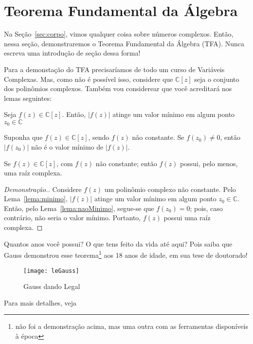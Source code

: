 
\section{Teorema Fundamental da Álgebra}
\label{sec:TFA}

Na Seção~\ref{sec:corpo}, vimos qualquer coisa sobre números complexos. 
Então, nessa seção, demonstraremos o \textsf{Teorema Fundamental da Álgebra} (TFA). 
Nunca escreva uma introdução de seção dessa forma!

Para a demonstação do \textsf{TFA} precisaríamos de todo um curso de Variáveis Complexas. 
Mas, como não é possível isso, considere que $\mathbb{C}[z]$ seja o conjunto dos 
polinômios complexos. 
Também vou considerear que você acreditará nos lemas seguintes:

\begin{lema}\label{lema:minimo}
  Seja $ f(z) \in \mathbb{C}[z] $. 
  Então, $ \vert f(z) \vert $ atinge um valor mínimo em algum ponto $ z_0 \in \mathbb{C} $
\end{lema}

\begin{lema}\label{lema:naoMinimo}
  Suponha que $ f(z) \in \mathbb{C}[z] $, sendo $ f(z) $ não constante. 
  Se $ f(z_0) \neq 0 $, então $ \vert f(z_0) \vert $ não é o valor mínimo de 
  $ \vert f(z) \vert $. 
\end{lema}

\begin{teorema}
  Se $ f(z) \in \mathbb{C}[z] $, com $ f(z) $ não constante; então $ f(z) $ 
  possui, pelo menos, uma raíz complexa.
\end{teorema}

\begin{proof}[Demonstração.]
  Considere $ f(z) $ um polinômio complexo não constante. 
  Pelo Lema~\ref{lema:minimo}, $ \vert f(z) \vert $ atinge um valor mínimo em 
  algum ponto $ z_0 \in \mathbb{C} $. 
  Então, pelo Lema~\ref{lema:naoMinimo}, segue-se que $ f(z_0) = 0 $; pois, 
  caso contrário, não seria o valor mínimo. 
  Portanto, $ f(z) $ possui uma raíz complexa. 
\end{proof}

Quantos anos você possui?
O que tens feito da vida até aqui? 
Pois saiba que Gauss demonstrou esse teorema\footnote{
  não foi a demonstração acima, mas uma outra com as ferramentas disponíveis à época
} aos 18 anos de idade, em sua tese de doutorado! 

\begin{figure}[!htbp]
  \centering
  \texttt{[image: leGauss]}
  \caption{Gauss dando Legal}
  \label{fig:leGauss}
\end{figure}

Para mais detalhes, veja \textcite{TFA}
